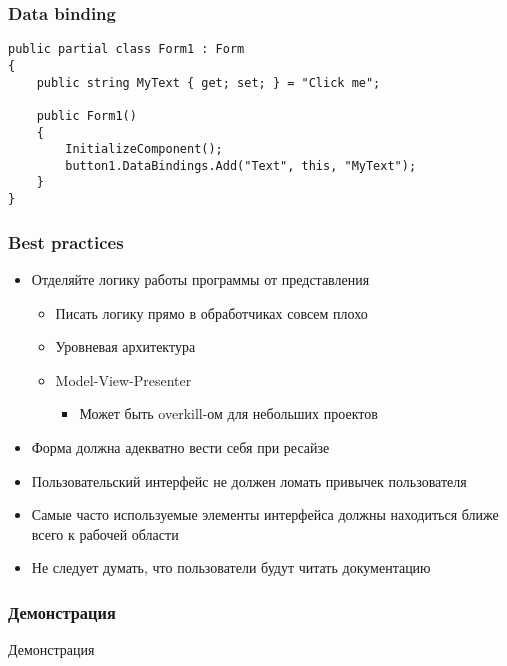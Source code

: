 \documentclass{../../slides-style}
\begin{document}
    \begin{frame}[fragile]
        \frametitle{Data binding}
        \begin{verbatim}
public partial class Form1 : Form
{
    public string MyText { get; set; } = "Click me";

    public Form1()
    {
        InitializeComponent();
        button1.DataBindings.Add("Text", this, "MyText");
    }
}
        \end{verbatim}
    \end{frame}

    \begin{frame}
        \frametitle{Best practices}
        \begin{itemize}
            \item Отделяйте логику работы программы от представления
            \begin{itemize}
                \item Писать логику прямо в обработчиках совсем плохо
                \item Уровневая архитектура
                \item Model-View-Presenter
                \begin{itemize}
                    \item Может быть overkill-ом для небольших проектов
                \end{itemize}
            \end{itemize}
            \item Форма должна адекватно вести себя при ресайзе
            \item Пользовательский интерфейс не должен ломать привычек пользователя
            \item Самые часто используемые элементы интерфейса должны находиться ближе всего к рабочей области
            \item Не следует думать, что пользователи будут читать документацию
        \end{itemize}
    \end{frame}

    \begin{frame}
        \frametitle{Демонстрация}
        \begin{Huge}\begin{center}Демонстрация\end{center}\end{Huge}
    \end{frame}
\end{document}
